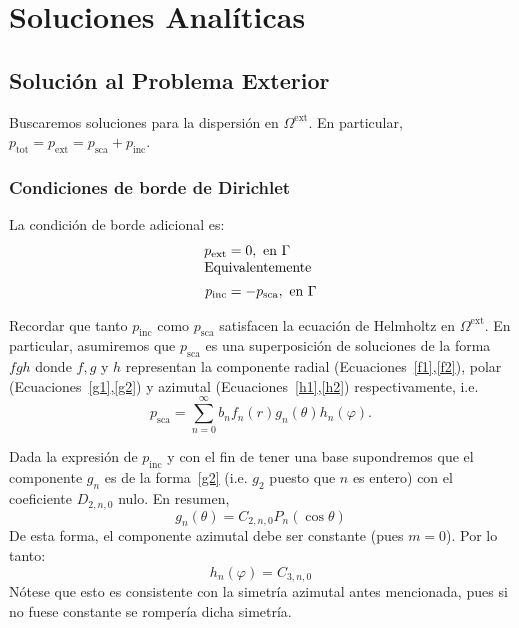 \documentclass[11pt]{article}
\numberwithin{equation}{section}
\def\tot{\textrm{tot}}
\def\exterior{\textrm{ext}}
\def\inc{\textrm{inc}}
\def\sca{\textrm{sca}}
\begin{document}
\section{Soluciones Analíticas}

\subsection{Solución al Problema Exterior}\label{ssec:a:exterior}

Buscaremos soluciones para la dispersión en \(\Omega^{\exterior}\). En particular,
\(p_{\tot} = p_{\exterior} = p_{\sca} + p_{\inc}\).

\subsubsection{Condiciones de borde de Dirichlet}
\label{ssec:a:exterior:dirichlet}

\noindent La condición de borde adicional es:
\begin{align}\label{bc:dirichlet}
	p_{\exterior} &= 0, \text{ en } \Gamma\\[-5pt]
	\intertext{Equivalentemente}
	p_{\inc} &= -p_{\sca}, \text{ en } \Gamma
\end{align}

Recordar que tanto \(p_{\inc}\) como \(p_{\sca}\) satisfacen la ecuación de
Helmholtz en \(\Omega^{\exterior}\). En particular, asumiremos que \(p_{\sca}\) es una
superposición de soluciones de la forma \(fgh\) donde \(f,g\) y \(h\) representan la componente
radial (Ecuaciones~\eqref{f1},\eqref{f2}), polar (Ecuaciones~\eqref{g1},\eqref{g2}) y azimutal
(Ecuaciones~\eqref{h1},\eqref{h2}) respectivamente, i.e.
\begin{displaymath}
	p_{\sca} = \sum_{n=0}^{\infty} b_n f_n(r) g_n(\theta) h_n(\varphi).
\end{displaymath}

Dada la expresión de \(p_{\inc}\) y con el fin de tener
una base supondremos que el componente \(g_n\) es de la forma~\eqref{g2} 
(i.e. \(g_2\) puesto que \(n\) es entero) con el coeficiente \(D_{2,n,0}\) nulo. 
En resumen,
\begin{equation}
\label{psca:g}
	g_n(\theta)
	=
	C_{2,n,0} P_{n} (\cos\theta)
\end{equation}
De esta forma, el componente azimutal debe ser constante (pues \(m=0\)).
Por lo tanto:
\begin{equation}\label{psca:h}
	h_n(\varphi)
	=
	C_{3,n,0}
\end{equation}
Nótese que esto es consistente con la simetría azimutal antes mencionada, pues si
no fuese constante se rompería dicha simetría.
\end{document}
